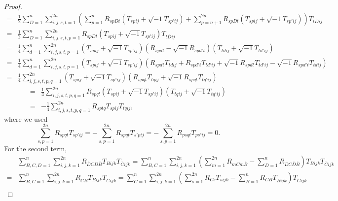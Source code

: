 \documentclass{amsart}
\theoremstyle{definition}
\theoremstyle{remark}
\numberwithin{equation}{section}
\begin{document}
\begin{proof}
\begin{align*}
    =& \frac{1}{2} \sum\limits_{D = 1}^n {\sum\limits_{i,j,s,t = 1}^{2n} {\left( {\sum\limits_{p = 1}^n {{R_{spDt}}\left( {{T_{spij}} + \sqrt { - 1} {T_{sp'ij}}} \right)}  + \sum\limits_{p = n + 1}^{2n} {{R_{spDt}}\left( {{T_{spij}} + \sqrt { - 1} {T_{sp'ij}}} \right)} } \right){T_{t\bar Dij}}} } \\
   =& \frac{1}{2} \sum\limits_{D = 1}^n {\sum\limits_{i,j,s,t,p = 1}^{2n} {{R_{spDt}}\left( {{T_{spij}} + \sqrt { - 1} {T_{sp'ij}}} \right){T_{t\bar Dij}}} }   \\
   =& \frac{1}{4} \sum\limits_{d = 1}^n {\sum\limits_{i,j,s,t,p = 1}^{2n} {\left( {{T_{spij}} + \sqrt { - 1} {T_{sp'ij}}} \right)\left( {{R_{spdt}} - \sqrt { - 1} {R_{spd't}}} \right)\left( {{T_{tdij}} + \sqrt { - 1} {T_{td'ij}}} \right)} }   \\
   =& \frac{1}{4} \sum\limits_{d = 1}^n {\sum\limits_{i,j,s,t,p = 1}^{2n} {\left( {{T_{spij}} + \sqrt { - 1} {T_{sp'ij}}} \right)\left( {{R_{spdt}}{T_{tdij}} + {R_{spd't}}{T_{td'ij}} + \sqrt { - 1} {R_{spdt}}{T_{td'ij}} - \sqrt { - 1} {R_{spd't}}{T_{tdij}}} \right)} }  \\
   =& \frac{1}{4} \sum\limits_{i,j,s,t,p,q = 1}^{2n} {\left( {{T_{spij}} + \sqrt { - 1} {T_{sp'ij}}} \right)\left( {{R_{spqt}}{T_{tqij}} + \sqrt { - 1} {R_{spqt}}{T_{tq'ij}}} \right)}
   \end{align*}
   \begin{align*}
   =& \frac{1}{4} \sum\limits_{i,j,s,t,p,q = 1}^{2n} {{R_{spqt}}\left( {{T_{spij}} + \sqrt { - 1} {T_{sp'ij}}} \right)\left( {{T_{tqij}} + \sqrt { - 1} {T_{tq'ij}}} \right)}  \\
   =&  - \frac{1}{4}\sum\limits_{i,j,s,t,p,q = 1}^{2n} {{R_{sptq}}{T_{spij}}{T_{tqij}}},
\end{align*}
where we used
$$\sum\limits_{s,p = 1}^{2n} {{R_{spqt}}{T_{sp'ij}}}= -\sum\limits_{s,p = 1}^{2n} {{R_{spqt}}{T_{s'pij}}} = -\sum\limits_{s,p = 1}^{2n} {{R_{psqt}}{T_{ps'ij}}} = 0.$$
For the second term,
\begin{align*}
  &\sum\limits_{B,C,D = 1}^n {\sum\limits_{i,j,k = 1}^{2n} {{R_{\bar DCD\bar B}}{T_{Bijk}}{T_{\bar Cijk}}} }
   = \sum\limits_{B,C = 1}^n {\sum\limits_{i,j,k = 1}^{2n} {\left( {\sum\limits_{m = 1}^{2n} {{R_{mCm\bar B}}}  - \sum\limits_{D = 1}^n {{R_{DC\bar D\bar B}}} } \right){T_{Bijk}}{T_{\bar Cijk}}} }  \\
   =& \sum\limits_{B,C = 1}^n {\sum\limits_{i,j,k = 1}^{2n} {{R_{C\bar B}}{T_{Bijk}}{T_{\bar Cijk}}} }
   = \sum\limits_{C = 1}^n {\sum\limits_{i,j,k = 1}^{2n} {\left( {\sum\limits_{s = 1}^{2n} {{R_{Cs}}{T_{sijk}}}  - \sum\limits_{B = 1}^n {{R_{CB}}{T_{\overline B ijk}}} } \right){T_{\overline C ijk}}} }  \\

\end{align*}
\end{proof}
\end{document}
